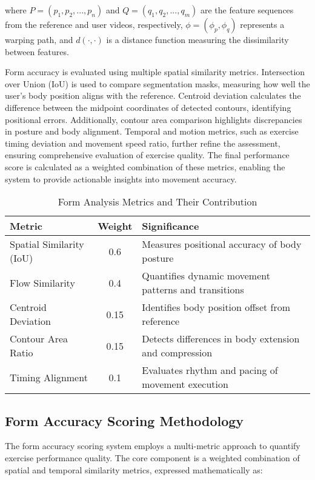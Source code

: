 \documentclass[conference]{IEEEtran}
\begin{document}
where $P = (p_1, p_2, ..., p_n)$ and $Q = (q_1, q_2, ..., q_m)$ are the feature sequences from the reference and user videos, respectively, $\phi = (\phi_p, \phi_q)$ represents a warping path, and $d(\cdot, \cdot)$ is a distance function measuring the dissimilarity between features.

Form accuracy is evaluated using multiple spatial similarity metrics. Intersection over Union (IoU) is used to compare segmentation masks, measuring how well the user's body position aligns with the reference. Centroid deviation calculates the difference between the midpoint coordinates of detected contours, identifying positional errors. Additionally, contour area comparison highlights discrepancies in posture and body alignment. Temporal and motion metrics, such as exercise timing deviation and movement speed ratio, further refine the assessment, ensuring comprehensive evaluation of exercise quality. The final performance score is calculated as a weighted combination of these metrics, enabling the system to provide actionable insights into movement accuracy.

\begin{table}[h]
\caption{Form Analysis Metrics and Their Contribution}
\centering
\begin{tabular}{|l|c|p{4.5cm}|}
\hline
\textbf{Metric} & \textbf{Weight} & \textbf{Significance} \\
\hline
Spatial Similarity (IoU) & 0.6 & Measures positional accuracy of body posture \\
\hline
Flow Similarity & 0.4 & Quantifies dynamic movement patterns and transitions \\
\hline
Centroid Deviation & 0.15 & Identifies body position offset from reference \\
\hline
Contour Area Ratio & 0.15 & Detects differences in body extension and compression \\
\hline
Timing Alignment & 0.1 & Evaluates rhythm and pacing of movement execution \\
\hline
\end{tabular}
\end{table}

\subsection{Form Accuracy Scoring Methodology} 
The form accuracy scoring system employs a multi-metric approach to quantify exercise performance quality. The core component is a weighted combination of spatial and temporal similarity metrics, expressed mathematically as:
\end{document}
